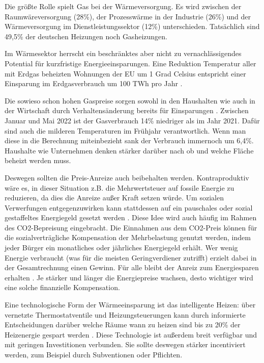 Die größte Rolle spielt Gas bei der Wärmeversorgung. 
Es wird zwischen der Raumwäreversorgung (28\%), der Prozesswärme in der Industrie (26\%) und der Wärmeversorgung im Dienstleistungssektor (12\%) unterschieden. Tatsächlich sind 49,5\% der deutschen Heizungen noch Gasheizungen.  

Im Wärmesektor herrscht ein beschränktes aber nicht zu vernachlässigendes Potential für kurzfristige Energieeinsparungen. Eine Reduktion Temperatur aller mit Erdgas beheizten Wohnungen der EU um 1 Grad Celsius entspricht einer Einsparung im Erdgasverbrauch um 100 TWh pro Jahr \cite{iea2022}.

Die sowieso schon hohen Gaspreise sorgen sowohl in den Haushalten wie auch in der Wirtschaft durch Verhaltensänderung bereits für Einsparungen \cite{tagesschau-gasverbrauch}. Zwischen Januar und Mai 2022 ist der Gasverbrauch 14\% niedriger als im Jahr 2021. Dafür sind auch die milderen Temperaturen im Frühjahr verantwortlich. Wenn man diese in die Berechnung miteinbezieht sank der Verbrauch immernoch um 6,4\%. Haushalte wie Unternehmen denken stärker darüber nach ob und welche Fläche beheizt werden muss.

Deswegen sollten die Preis-Anreize auch beibehalten werden. Kontraproduktiv wäre es, in dieser Situation z.B. die Mehrwertsteuer auf fossile Energie zu reduzieren, da dies die Anreize außer Kraft setzen würde. Um sozialen Verwerfungen entgegenzuwirken kann stattdessen auf ein pauschales oder sozial gestaffeltes Energiegeld gesetzt werden \cite{clausen2022}. Diese Idee wird auch häufig im Rahmen des CO2-Bepreisung eingebracht. Die Einnahmen aus dem CO2-Preis können für die sozialverträgliche Kompensation der Mehrbelastung genutzt werden, indem jeder Bürger ein monatliches oder jährliches Energiegeld erhält. Wer wenig Energie verbraucht (was für die meisten Geringverdiener zutrifft) erzielt dabei in der Gesamtrechnung einen Gewinn. Für alle bleibt der Anreiz zum Energiesparen erhalten \cite{leo}. Je stärker und länger die Energiepreise wachsen, desto wichtiger wird eine solche finanzielle Kompensation.

Eine technologische Form der Wärmeeinsparung ist das intelligente Heizen: über vernetzte Thermostatventile und Heizungsteuerungen kann durch informierte Entscheidungen darüber welche Räume wann zu heizen sind bis zu 20\% der Heizenergie gespart werden \cite{clausen2022}. Diese Technologie ist außerdem breit verfügbar und mit geringen Investitionen verbunden. Sie sollte deswegen stärker incentiviert werden, zum Beispiel durch Subventionen oder Pflichten.

